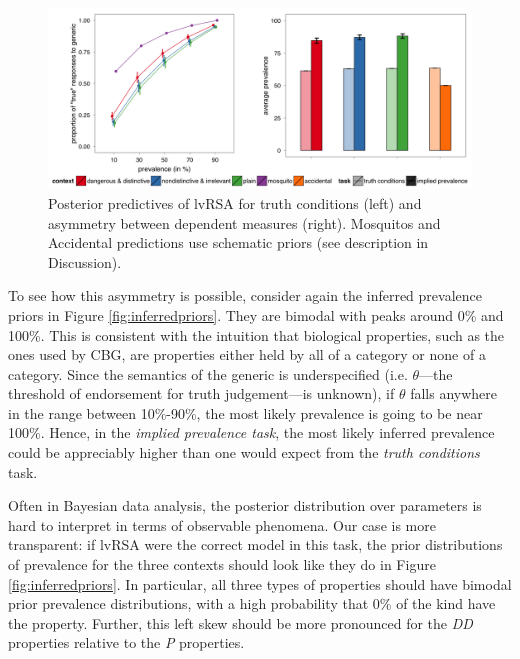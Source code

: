 \documentclass[10pt,letterpaper]{article}
\begin{document}

\begin{figure}
\centering
    \includegraphics[width=\columnwidth]{lvRSA_postpreds_wSims}
    \caption{Posterior predictives of lvRSA for truth conditions (left) and asymmetry between dependent measures (right). Mosquitos and Accidental predictions use schematic priors (see description in Discussion).}
  \label{fig:lvRSAposteriorpred}
\end{figure}


To see how this asymmetry is possible, consider again the inferred prevalence priors in Figure \ref{fig:inferredpriors}. They are bimodal with peaks around 0\% and 100\%. This is consistent with the intuition that biological properties, such as the ones used by CBG, are properties either held by all of a category or none of a category. Since the semantics of the generic is underspecified (i.e. $\theta$---the threshold of endorsement for truth judgement---is unknown), if $\theta$ falls anywhere in the range between 10\%-90\%, the most likely prevalence is going to be near 100\%. Hence, in the \emph{implied prevalence task}, the most likely inferred prevalence could be appreciably higher than one would expect from the \emph{truth conditions} task. 





Often in Bayesian data analysis, the posterior distribution over parameters is hard to interpret in terms of observable phenomena. Our case is more transparent: if lvRSA were the correct model in this task, the prior distributions of prevalence for the three contexts should look like they do in Figure \ref{fig:inferredpriors}. 
In particular, all three types of properties should have bimodal prior prevalence distributions, with a high probability that 0\% of the kind have the property. Further, this left skew should be more pronounced for the \emph{DD} properties relative to the \emph{P} properties. 
\end{document}
